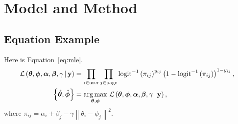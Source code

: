 \chapter{Model and Method}
\label{c:model&method}

\section{Equation Example}
\label{s:equation}

Here is Equation~\ref{eq:mle}.
\begin{align} \label{eq:mle}
\begin{split}
\mathcal{L}\left(\vec{\theta}, \vec{\phi}, \vec{\alpha}, \vec{\beta}, \gamma \,|\, \boldsymbol{\mathrm{y}}\right)&=\prod_{i\in\mathrm{user}}\prod_{j\in\mathrm{page}}\mathrm{logit}^{-1}\left(\pi_{ij}\right)^{y_{ij}}\left(1-\mathrm{logit}^{-1}\left(\pi_{ij}\right)\right)^{1-y_{ij}},\\
\left\{\hat{\vec{\theta}},\hat{\vec{\phi}}\right\}&=\argmax_{\vec{\theta}, \vec{\phi}}\,\mathcal{L}\left(\vec{\theta}, \vec{\phi}, \vec{\alpha}, \vec{\beta}, \gamma \,|\, \boldsymbol{\mathrm{y}}\right),
\end{split}
\end{align}
where $\pi_{ij}=\alpha_i+\beta_j-\gamma\left\lVert\theta_i-\phi_j\right\rVert^2$. 
